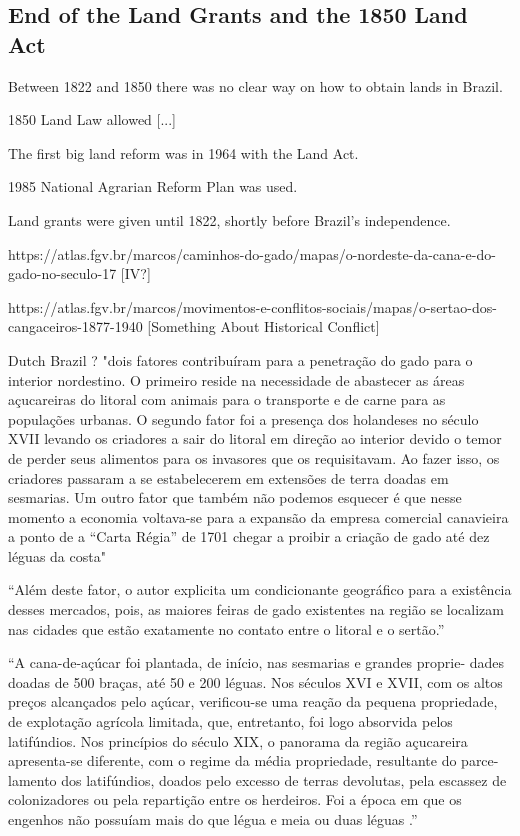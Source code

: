 \documentclass{article}
\begin{document}
\subsection{End of the Land Grants and the 1850 Land Act}

Between 1822 and 1850 there was no clear way on how to obtain lands in Brazil.

1850 Land Law allowed [...]

The first big land reform was in 1964 with the Land Act.

1985 National Agrarian Reform Plan was used.

Land grants were given until 1822, shortly before Brazil's independence.

https://atlas.fgv.br/marcos/caminhos-do-gado/mapas/o-nordeste-da-cana-e-do-gado-no-seculo-17 [IV?]

https://atlas.fgv.br/marcos/movimentos-e-conflitos-sociais/mapas/o-sertao-dos-cangaceiros-1877-1940 [Something About Historical Conflict]

Dutch Brazil ? "dois fatores contribuíram para a penetração do gado para o interior nordestino. O primeiro reside na necessidade de abastecer as áreas açucareiras do litoral com animais para o transporte e de carne para as populações urbanas. O segundo fator foi a presença dos holandeses no século XVII levando os criadores a sair do litoral em direção ao interior devido o temor de perder seus alimentos para os invasores que os requisitavam. Ao fazer isso, os criadores passaram a se estabelecerem em extensões de terra doadas em sesmarias. Um outro fator que também não podemos esquecer é que nesse momento a economia voltava-se para a expansão da empresa comercial canavieira a ponto de a “Carta Régia” de 1701 chegar a proibir a criação de gado até dez léguas da costa" 

``Além deste fator, o autor explicita um condicionante geográfico para a existência desses mercados, pois, as maiores feiras de gado existentes na região se localizam nas cidades que estão exatamente no contato entre o litoral e o sertão.'' \parencite{Galdino_Dantas2008-pw}

``A  cana-de-açúcar foi  plantada,  de  início,  nas sesmarias  e  grandes  proprie- dades  doadas de  500  braças,  até  50  e  200  léguas.  Nos  séculos XVI  e  XVII,  com  os  altos  preços  alcançados  pelo  açúcar,  verificou-se  uma  reação  da  pequena  propriedade,  de  explotação agrícola  limitada,  que,  entretanto,  foi  logo  absorvida  pelos latifúndios. Nos  princípios  do  século  XIX, o panorama da região  açucareira  apresenta-se diferente,  com o  regime da média propriedade, resultante  do parce- lamento  dos  latifúndios,  doados  pelo  excesso  de  terras  devolutas,  pela  escassez  de  colonizadores  ou  pela  repartição  entre  os  herdeiros.  Foi  a  época  em  que  os  engenhos  não  possuíam  mais  do  que  légua  e  meia  ou  duas  léguas .''
\parencite[p.~118]{De_Geografia1970-nk}
\end{document}
